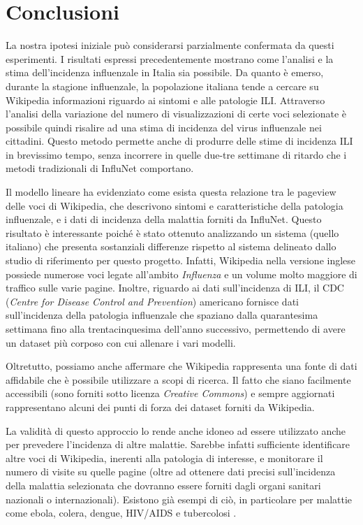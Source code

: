 \newpage

\chapter{Conclusioni}
\bigskip

La nostra ipotesi iniziale può considerarsi parzialmente confermata da questi esperimenti. 
I risultati espressi precedentemente mostrano come l'analisi e la stima dell'incidenza influenzale in Italia sia possibile.
Da quanto è emerso, durante la stagione influenzale, la popolazione italiana tende a cercare su Wikipedia informazioni 
riguardo ai sintomi e alle patologie ILI. Attraverso l'analisi della variazione del numero di visualizzazioni di certe voci 
selezionate è possibile quindi risalire ad una stima di incidenza del virus influenzale nei cittadini. Questo metodo 
permette anche di produrre delle stime di incidenza ILI in brevissimo tempo, senza incorrere in quelle due-tre settimane di ritardo che i metodi tradizionali di InfluNet comportano. 
\bigskip 

Il modello lineare ha evidenziato come esista questa relazione tra le pageview delle voci di Wikipedia, che descrivono 
sintomi e caratteristiche della patologia influenzale, e i dati di incidenza della malattia forniti da InfluNet. Questo 
risultato è interessante poiché è stato ottenuto analizzando un sistema (quello italiano) che presenta sostanziali differenze 
rispetto al sistema delineato dallo studio di riferimento per questo progetto. Infatti, Wikipedia nella versione inglese 
possiede numerose voci legate all'ambito \textit{Influenza} e un volume molto maggiore di traffico sulle varie pagine. 
Inoltre, riguardo ai dati sull'incidenza di ILI, il CDC (\textit{Centre for Disease Control and Prevention}) americano 
fornisce dati sull'incidenza della patologia influenzale che spaziano dalla quarantesima settimana fino alla trentacinquesima 
dell'anno successivo, permettendo di avere un dataset più corposo con cui allenare i vari modelli.      
\bigskip

Oltretutto, possiamo anche affermare che Wikipedia rappresenta una fonte di dati affidabile che è possibile 
utilizzare a scopi di ricerca. Il fatto che siano facilmente accessibili (sono forniti sotto licenza \textit{Creative 
Commons}) e sempre aggiornati rappresentano alcuni dei punti di forza dei dataset forniti da Wikipedia.   
\bigskip

La validità di questo approccio lo rende anche idoneo ad essere utilizzato anche per prevedere l'incidenza di altre malattie. 
Sarebbe infatti sufficiente identificare altre voci di Wikipedia, inerenti alla patologia di interesse, e monitorare il 
numero di visite su quelle pagine (oltre ad ottenere dati precisi sull'incidenza della malattia selezionata che dovranno 
essere forniti dagli organi sanitari nazionali o internazionali). Esistono già esempi di ciò, in particolare per malattie 
come ebola, colera, dengue, HIV/AIDS e tubercolosi \cite{Generous2014}.
\bigskip

